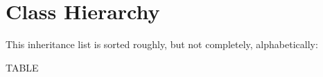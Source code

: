 \section{Class Hierarchy}
This inheritance list is sorted roughly, but not completely, alphabetically\+:\begin{DoxyCompactList}
\item {}
\begin{DoxyCompactList}
\item {}
\end{DoxyCompactList}
\item T\+A\+B\+LE\begin{DoxyCompactList}
\item {}
\end{DoxyCompactList}
\end{DoxyCompactList}
